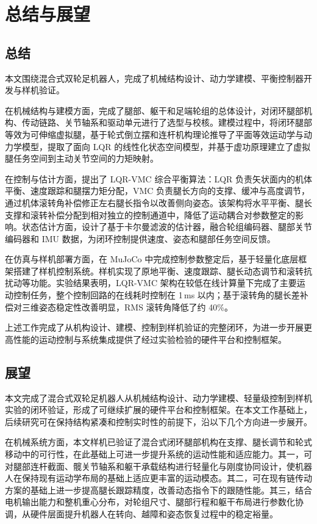 \chapter{总结与展望}\label{chap:conclusion}

\section{总结}

本文围绕混合式双轮足机器人，完成了机械结构设计、动力学建模、平衡控制器开发与样机验证。

在机械结构与建模方面，完成了腿部、躯干和足端轮组的总体设计，对闭环腿部机构、传动链路、关节轴系和驱动单元进行了选型与校核。建模过程中，将闭环腿部等效为可伸缩虚拟腿，基于轮式倒立摆和连杆机构理论推导了平面等效运动学与动力学模型，提取了面向 LQR 的线性化状态空间模型，并基于虚功原理建立了虚拟腿任务空间到主动关节空间的力矩映射。

在控制与估计方面，提出了 LQR-VMC 综合平衡算法：LQR 负责矢状面内的机体平衡、速度跟踪和腿摆力矩分配，VMC 负责腿长方向的支撑、缓冲与高度调节，通过机体滚转角补偿修正左右腿长指令以改善侧向姿态。该架构将水平平衡、腿长支撑和滚转补偿分配到相对独立的控制通道中，降低了运动耦合对参数整定的影响。状态估计方面，设计了基于卡尔曼滤波的估计器，融合轮组编码器、腿部关节编码器和 IMU 数据，为闭环控制提供速度、姿态和腿部任务空间反馈。

在仿真与样机部署方面，在 MuJoCo 中完成控制参数整定后，基于轻量化底层框架搭建了样机控制系统。样机实现了原地平衡、速度跟踪、腿长动态调节和滚转抗扰动等功能。实验结果表明，LQR-VMC 架构在较低在线计算量下完成了主要运动控制任务，整个控制回路的在线耗时控制在 1\,ms 以内；基于滚转角的腿长差补偿对三维姿态稳定性改善明显，RMS 滚转角降低了约 40\%。

上述工作完成了从机构设计、建模、控制到样机验证的完整闭环，为进一步开展更高性能的运动控制与系统集成提供了经过实验检验的硬件平台和控制框架。

\section{展望}

本文完成了混合式双轮足机器人从机械结构设计、动力学建模、轻量级控制到样机实验的闭环验证，形成了可继续扩展的硬件平台和控制框架。在本文工作基础上，后续研究可在保持结构紧凑和控制实时性的前提下，沿以下几个方向进一步展开。

在机械系统方面，本文样机已验证了混合式闭环腿部机构在支撑、腿长调节和轮式移动中的可行性，在此基础上可进一步提升系统的运动性能和适应能力。其一，可对腿部连杆截面、髋关节轴系和躯干承载结构进行轻量化与刚度协同设计，使机器人在保持现有运动学布局的基础上适应更丰富的运动模态。其二，可在现有链传动方案的基础上进一步提高腿长跟踪精度，改善动态指令下的跟随性能。其三，结合电机输出能力和整机重心分布，对轮组尺寸、腿部行程和躯干布局进行参数化协调，从硬件层面提升机器人在转向、越障和姿态恢复过程中的稳定裕量。

